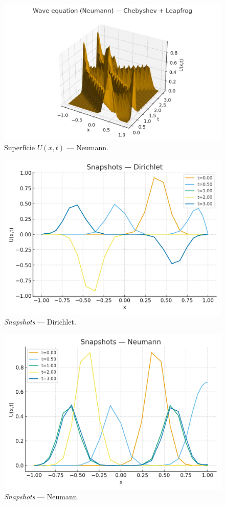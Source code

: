 \documentclass[12pt,a4paper]{article}
\begin{document}
\begin{figure}[H]\centering
\includegraphics[width=.85\linewidth]{figures/wave_neumann_surface.png}
\caption{Superfície \(U(x,t)\) — Neumann.}\label{fig:wave_neumann_surface}
\end{figure}

\begin{figure}[H]\centering
\includegraphics[width=.85\linewidth]{figures/dirichlet_snapshots.png}
\caption{\emph{Snapshots} — Dirichlet.}\label{fig:dirichlet_snapshots}
\end{figure}

\begin{figure}[H]\centering
\includegraphics[width=.85\linewidth]{figures/neumann_snapshots.png}
\caption{\emph{Snapshots} — Neumann.}\label{fig:neumann_snapshots}
\end{figure}
\end{document}
